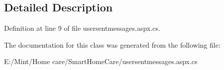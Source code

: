 \subsection{Detailed Description}


Definition at line 9 of file usersentmessages.\-aspx.\-cs.



The documentation for this class was generated from the following file\-:\begin{DoxyCompactItemize}
\item 
E\-:/\-Mint/\-Home care/\-Smart\-Home\-Care/usersentmessages.\-aspx.\-cs\end{DoxyCompactItemize}
